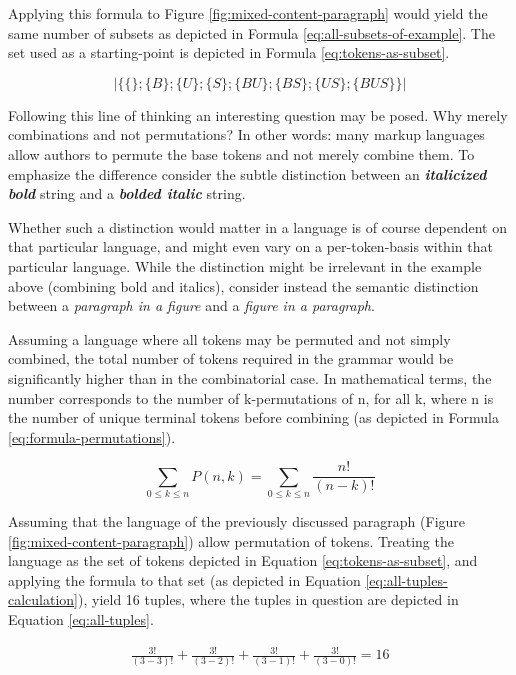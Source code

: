 \documentclass{scrreprt}
\begin{document}
Applying this formula to Figure \ref{fig:mixed-content-paragraph} would yield the same number of subsets as depicted in Formula \ref{eq:all-subsets-of-example}. The set used as a starting-point is depicted in Formula \ref{eq:tokens-as-subset}.

\begin{equation}
|\{\{\};\{B\};\{U\};\{S\};\{BU\};\{BS\};\{US\};\{BUS\}\}|
\label{eq:all-subsets-of-example}
\end{equation}


Following this line of thinking an interesting question may be posed. Why merely combinations and not permutations? In other words: many markup languages allow authors to permute the base tokens and not merely combine them. To emphasize the difference consider the subtle distinction between an \textit{\textbf{italicized bold}} string and a \textit{\textbf{bolded italic}} string.

Whether such a distinction would matter in a language is of course dependent on that particular language, and might even vary on a per-token-basis within that particular language. While the distinction might be irrelevant in the example above (combining bold and italics), consider instead the semantic distinction between a \emph{paragraph in a figure} and a \emph{figure in a paragraph}.

Assuming a language where all tokens may be permuted and not simply combined, the total number of tokens required in the grammar would be significantly higher than in the combinatorial case. In mathematical terms, the number corresponds to the number of k-permutations of n, for all k, where n is the number of unique terminal tokens before combining (as depicted in Formula \ref{eq:formula-permutations}).


\begin{equation}
\sum_{0\leq{k}\leq{n}} P(n,k) = 
\sum_{0\leq{k}\leq{n}} \frac{n!}{(n-k)!}
\label{eq:formula-permutations}
\end{equation}

Assuming that the language of the previously discussed paragraph (Figure \ref{fig:mixed-content-paragraph}) allow permutation of tokens. Treating the language as the set of tokens depicted in Equation \ref{eq:tokens-as-subset}, and applying the formula to that set (as depicted in Equation \ref{eq:all-tuples-calculation}), yield 16 tuples, where the tuples in question are depicted in Equation \ref{eq:all-tuples}.



\begin{equation}
\begin{split}
\frac{3!}{(3-3)!} + \frac{3!}{(3-2)!} + \frac{3!}{(3-1)!} + \frac{3!}{(3-0)!} = 
16
\label{eq:all-tuples-calculation}
\end{split}
\end{equation}
\end{document}
